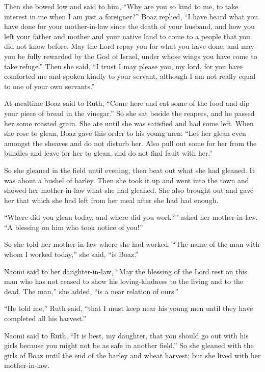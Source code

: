  Then she bowed low and said to him, ``Why are you so kind
to me, to take interest in me when I am just a foreigner?''
 Boaz replied, ``I have heard what you have done for your
mother-in-law since the death of your husband, and how you left your
father and mother and your native land to come to a people that you did
not know before.  May the Lord repay you for what you have
done, and may you be fully rewarded by the God of Israel, under whose
wings you have come to take refuge.''  Then she said, ``I
trust I may please you, my lord, for you have comforted me and spoken
kindly to your servant, although I am not really equal to one of your
own servants.''

 At mealtime Boaz said to Ruth, ``Come here and eat some of
the food and dip your piece of bread in the vinegar.'' So she sat beside
the reapers, and he passed her some roasted grain. She ate until she was
satisfied and had some left.  When she rose to glean, Boaz
gave this order to his young men: ``Let her glean even amongst the
sheaves and do not disturb her.  Also pull out some for her
from the bundles and leave for her to glean, and do not find fault with
her.''

 So she gleaned in the field until evening, then beat out
what she had gleaned. It was about a bushel of barley. 
Then she took it up and went into the town and showed her mother-in-law
what she had gleaned. She also brought out and gave her that which she
had left from her meal after she had had enough.

 ``Where did you glean today, and where did you work?''
asked her mother-in-law. ``A blessing on him who took notice of you!''

So she told her mother-in-law where she had worked. ``The name of the
man with whom I worked today,'' she said, ``is Boaz.''

 Naomi said to her daughter-in-law, ``May the blessing of
the Lord rest on this man who has not ceased to show his loving-kindness
to the living and to the dead. The man,'' she added, ``is a near
relation of ours.''

 ``He told me,'' Ruth said, ``that I must keep near his
young men until they have completed all his harvest.''

 Naomi said to Ruth, ``It is best, my daughter, that you
should go out with his girls because you might not be as safe in another
field.''  So she gleaned with the girls of Boaz until the
end of the barley and wheat harvest; but she lived with her
mother-in-law.

